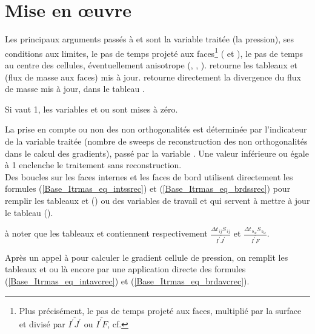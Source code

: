 \section*{Mise en \oe uvre}
Les principaux arguments passés à  et  sont la
variable traitée  (la pression), ses conditions aux limites, le pas
de temps projeté aux faces\footnote{%
Plus précisément, le pas de temps projeté aux faces, multiplié par la
surface et divisé par $\overline{I^\prime J^\prime}$ ou $\overline{I^\prime F}$, cf. }
( et ), le pas de temps au
centre des cellules, éventuellement anisotrope (, ,
).  retourne les tableaux  et 
(flux de masse aux faces) mis à jour.  retourne directement la
divergence du flux de masse mis à jour, dans le tableau .

Si  vaut 1, les variables  et  ou 
sont mises à zéro.

La prise en compte ou non des non orthogonalités est déterminée par
l'indicateur  de la variable traitée (nombre de sweeps de
reconstruction des non orthogonalités dans le calcul des gradients), passé
par la variable . Une valeur inférieure ou égale à 1 enclenche
le traitement sans reconstruction.\\
Des boucles sur les faces internes et les faces de bord utilisent directement
les formules (\ref{Base_Itrmas_eq_intssrec}) et (\ref{Base_Itrmas_eq_brdssrec}) pour remplir les
tableaux  et  () ou des variables de
travail  et  qui servent à mettre à jour le tableau
 ().

à noter que les tableaux  et  contiennent respectivement
$\displaystyle\frac{\Delta t_{\,ij}S_{\,ij}}{\overline{I^\prime J^\prime}}$ et
$\displaystyle\frac{\Delta t_{\,b_{ik}}S_{\,b_{ik}}}{\overline{I^\prime F}}$.

Après un appel à  pour calculer le gradient cellule de
pression, on remplit les tableaux  et  ou 
là encore par une application directe des formules (\ref{Base_Itrmas_eq_intavcrec}) et
(\ref{Base_Itrmas_eq_brdavcrec}).

